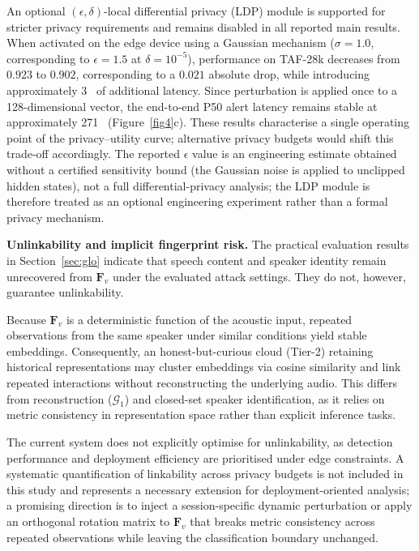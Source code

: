 \documentclass[a4paper,fleqn]{cas-sc}
\begin{document}
An optional $(\epsilon, \delta)$-local differential privacy (LDP) module is supported for stricter privacy requirements and remains disabled in all reported main results. When activated on the edge device using a Gaussian mechanism ($\sigma = 1.0$, corresponding to $\epsilon = 1.5$ at $\delta = 10^{-5}$), performance on TAF-28k decreases from $0.923$ to $0.902$, corresponding to a $0.021$ absolute drop, while introducing approximately 3~ of additional latency. Since perturbation is applied once to a 128-dimensional vector, the end-to-end P50 alert latency remains stable at approximately 271~ (Figure~\ref{fig4}c). These results characterise a single operating point of the privacy--utility curve; alternative privacy budgets would shift this trade-off accordingly. The reported $\epsilon$ value is an engineering estimate obtained without a certified sensitivity bound (the Gaussian noise is applied to unclipped hidden states), not a full differential-privacy analysis; the LDP module is therefore treated as an optional engineering experiment rather than a formal privacy mechanism.

\textbf{Unlinkability and implicit fingerprint risk.}
The practical evaluation results in Section~\ref{sec:glo} indicate that speech content and speaker identity remain unrecovered from $\mathbf{F}_v$ under the evaluated attack settings. They do not, however, guarantee unlinkability.

Because $\mathbf{F}_v$ is a deterministic function of the acoustic input, repeated observations from the same speaker under similar conditions yield stable embeddings. Consequently, an honest-but-curious cloud (Tier-2) retaining historical representations may cluster embeddings via cosine similarity and link repeated interactions without reconstructing the underlying audio. This differs from reconstruction ($\mathcal{G}_1$) and closed-set speaker identification, as it relies on metric consistency in representation space rather than explicit inference tasks.

The current system does not explicitly optimise for unlinkability, as detection performance and deployment efficiency are prioritised under edge constraints. A systematic quantification of linkability across privacy budgets is not included in this study and represents a necessary extension for deployment-oriented analysis; a promising direction is to inject a session-specific dynamic perturbation or apply an orthogonal rotation matrix to $\bm{F}_v$ that breaks metric consistency across repeated observations while leaving the classification boundary unchanged.
\end{document}
